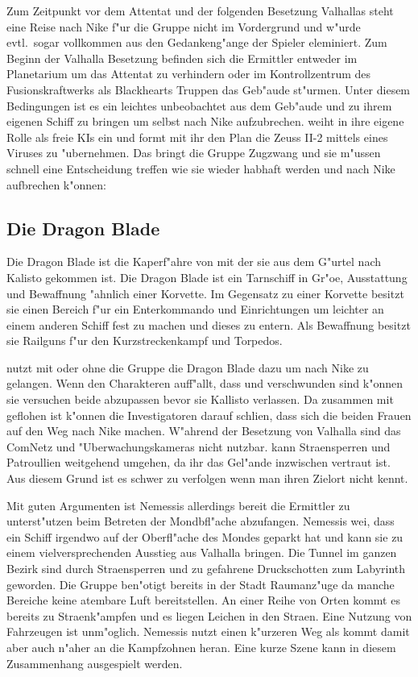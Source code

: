 Zum Zeitpunkt vor dem Attentat und der folgenden Besetzung Valhallas steht eine Reise nach Nike f"ur die Gruppe nicht im Vordergrund und w"urde evtl.~sogar vollkommen aus den Gedankeng"ange der Spieler eleminiert. Zum Beginn der Valhalla Besetzung befinden sich die Ermittler entweder im Planetarium um das Attentat zu verhindern oder im Kontrollzentrum des Fusionskraftwerks als Blackhearts Truppen das Geb"aude st"urmen. Unter diesem Bedingungen ist es \xl{} ein leichtes \ml{} unbeobachtet aus dem Geb"aude und zu ihrem eigenen Schiff zu bringen um selbst nach Nike aufzubrechen. \xl{} weiht \ml{} in ihre eigene Rolle als freie KIs ein und formt mit ihr den Plan die Zeuss II-2 mittels eines Viruses zu "ubernehmen. Das bringt die Gruppe Zugzwang und sie m"ussen schnell eine Entscheidung treffen wie sie \ml{} wieder habhaft werden und nach Nike aufbrechen k"onnen:

\subsection{Die Dragon Blade}

Die Dragon Blade ist die Kaperf"ahre von \xl{} mit der sie aus dem G"urtel nach Kalisto gekommen ist. Die Dragon Blade 
ist ein Tarnschiff in Gr"o\3e, Ausstattung und Bewaffnung "ahnlich einer Korvette. Im Gegensatz zu einer Korvette 
besitzt sie einen Bereich f"ur ein Enterkommando und Einrichtungen um leichter an einem anderen Schiff fest zu machen 
und dieses zu entern. Als Bewaffnung besitzt sie Railguns f"ur den Kurzstreckenkampf und Torpedos.

\xl{} nutzt mit oder ohne die Gruppe die Dragon Blade dazu um nach Nike zu gelangen. Wenn den Charakteren auff"allt, dass \ml{} und \xl{} verschwunden sind k"onnen sie versuchen beide abzupassen bevor sie Kallisto verlassen. Da \xl{} zusammen mit \ml{} geflohen ist k"onnen die Investigatoren darauf schli\3en, dass sich die beiden Frauen auf den Weg nach Nike machen. W"ahrend der Besetzung von Valhalla sind das ComNetz und "Uberwachungskameras nicht nutzbar. \xl{} kann Stra\3ensperren und Patroullien weitgehend umgehen, da ihr das Gel"ande inzwischen vertraut ist. Aus diesem Grund ist es schwer \xl{} zu verfolgen wenn man ihren Zielort nicht kennt. 

Mit guten Argumenten ist Nemessis allerdings bereit die Ermittler zu unterst"utzen \xl{} beim Betreten der Mondbfl"ache abzufangen. Nemessis wei\3, dass \xl{} ein Schiff irgendwo auf der Oberfl"ache des Mondes geparkt hat und kann sie zu einem vielversprechenden Ausstieg aus Valhalla bringen. Die Tunnel im ganzen Bezirk sind durch Stra\3ensperren und zu gefahrene Druckschotten zum Labyrinth geworden. Die Gruppe ben"otigt bereits in der Stadt Raumanz"uge da manche Bereiche keine atembare Luft bereitstellen. An einer Reihe von Orten kommt es bereits zu Stra\3enk"ampfen und es liegen Leichen in den Stra\3en. Eine Nutzung von Fahrzeugen ist unm"oglich. Nemessis nutzt einen k"urzeren Weg als \xl{} kommt damit aber auch n"aher an die Kampfzohnen heran. Eine kurze Szene kann in diesem Zusammenhang ausgespielt werden.

